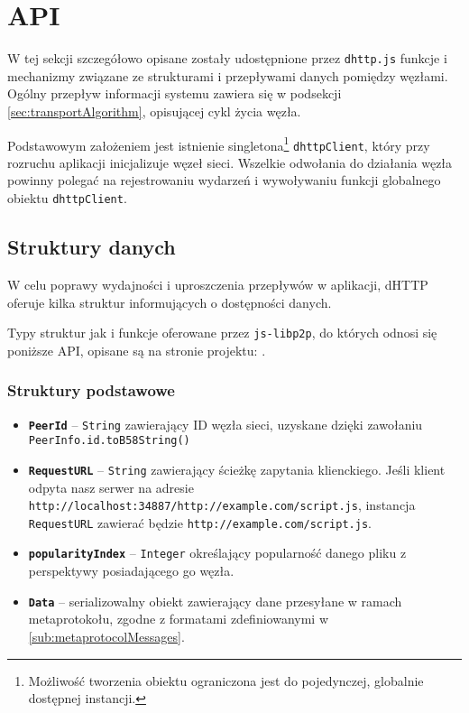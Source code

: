 \section{API}
\label{sec:api}

W tej sekcji szczegółowo opisane zostały udostępnione przez \texttt{dhttp.js} funkcje i mechanizmy związane ze strukturami i przepływami danych pomiędzy węzłami. Ogólny przepływ informacji systemu zawiera się w podsekcji \ref{sec:transportAlgorithm}, opisującej cykl życia węzła.

Podstawowym założeniem jest istnienie singletona\footnote{Możliwość tworzenia obiektu ograniczona jest do pojedynczej, globalnie dostępnej instancji.} \texttt{dhttpClient}, który przy rozruchu aplikacji inicjalizuje węzeł sieci. Wszelkie odwołania do działania węzła powinny polegać na rejestrowaniu wydarzeń i wywoływaniu funkcji globalnego obiektu \texttt{dhttpClient}.

\subsection{Struktury danych}
W celu poprawy wydajności i uproszczenia przepływów w aplikacji, dHTTP oferuje kilka struktur informujących o dostępności danych.

Typy struktur jak i funkcje oferowane przez \texttt{js-libp2p}, do których odnosi się poniższe API, opisane są na stronie projektu: \cite{libp2pReadme}.

\subsubsection{Struktury podstawowe}
\begin{itemize}
    \item \textbf{\texttt{PeerId}} -- \texttt{String} zawierający ID węzła sieci, uzyskane dzięki zawołaniu \texttt{PeerInfo.id.toB58String()}
    \item \textbf{\texttt{RequestURL}} -- \texttt{String} zawierający ścieżkę zapytania klienckiego. Jeśli klient odpyta nasz serwer na adresie \texttt{http://localhost:34887/http://example.com/script.js}, instancja \texttt{RequestURL} zawierać będzie \texttt{http://example.com/script.js}.
    \item \textbf{\texttt{popularityIndex}} -- \texttt{Integer} określający popularność danego pliku z perspektywy posiadającego go węzła.
    \item \textbf{\texttt{Data}} -- serializowalny obiekt zawierający dane przesyłane w ramach metaprotokołu, zgodne z formatami zdefiniowanymi w \ref{sub:metaprotocolMessages}.
\end{itemize}

